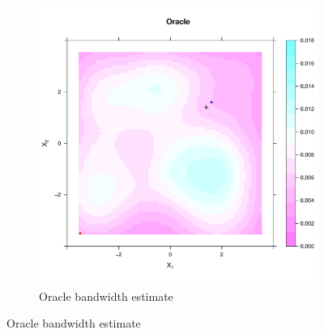 \begin{figure}[htbp]
\begin{subfigure}[t]{0.45\textwidth}
    \includegraphics[width=\textwidth]{results/unif_100_unif/output/oracle_intensity_heatmap}
    \caption{Oracle bandwidth estimate}
    \end{subfigure}



\end{figure}
